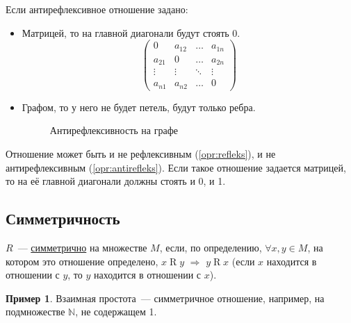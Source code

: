 \documentclass[russian]{lecture-notes}
\theoremstyle{definition}
\newtheorem{example*}{Пример}[subsection]
\newcommand{\relation}[2]{$#1\mathrel{R}#2$}
\begin{document}
Если антирефлексивное отношение задано:
\begin{itemize}
	\item Матрицей, то на главной диагонали будут стоять 0.
	\begin{equation*}
	\left(
	\begin{array}{cccc}
	0 & a_{12} & \ldots & a_{1n}\\
	a_{21} & 0 & \ldots & a_{2n}\\
	\vdots & \vdots & \ddots & \vdots\\
	a_{n1} & a_{n2} & \ldots & 0
	\end{array}
	\right)
	\end{equation*}
	
	\item Графом, то у него не будет петель, будут только ребра.
	
	\begin{figure}[H]
		\centering
		\caption{\small Антирефлексивность на графе}
		\label{fig:antirefleks}
	\end{figure}
\end{itemize}

\begin{note}	
	Отношение может быть и не рефлексивным (\ref{opr:refleks}), и не антирефлексивным (\ref{opr:antirefleks}). Если такое отношение задается матрицей, то на её главной диагонали должны стоять и 0, и 1.
\end{note}

\subsection{Симметричность \label{opr:simmetr}}
\begin{definition}
	$R$~--- \underline{симметрично} на множестве $M$, если, по определению, $\forall x, y \in M$, на котором это отношение определено, \relation{x}{y} $\Rightarrow$ \relation{y}{x} (если $x$ находится в отношении с $y$, то $y$ находится в отношении с $x$).
\end{definition}

\begin{example*}
	Взаимная простота~--- симметричное отношение, например, на подмножестве $\mathbb{N}$, не содержащем 1.
\end{example*}
\end{document}
